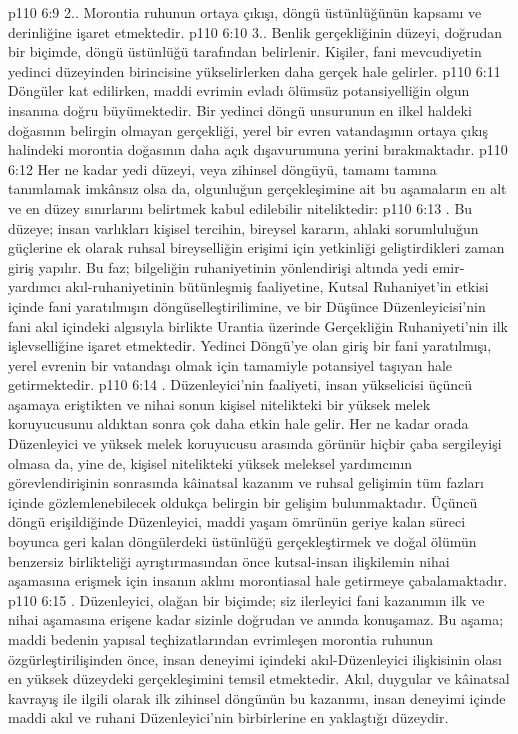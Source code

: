 \vs p110 6:9 2.\bibnobreakspace {}. Morontia ruhunun ortaya çıkışı, döngü üstünlüğünün kapsamı ve derinliğine işaret etmektedir.
\vs p110 6:10 3.\bibnobreakspace {}. Benlik gerçekliğinin düzeyi, doğrudan bir biçimde, döngü üstünlüğü tarafından belirlenir. Kişiler, fani mevcudiyetin yedinci düzeyinden birincisine yükselirlerken daha gerçek hale gelirler.
\vs p110 6:11 Döngüler kat edilirken, maddi evrimin evladı ölümsüz potansiyelliğin olgun insanına doğru büyümektedir. Bir yedinci döngü unsurunun en ilkel haldeki doğasının belirgin olmayan gerçekliği, yerel bir evren vatandaşının ortaya çıkış halindeki morontia doğasının daha açık dışavurumuna yerini bırakmaktadır.
\vs p110 6:12 Her ne kadar yedi düzeyi, veya zihinsel döngüyü, tamamı tamına tanımlamak imkânsız olsa da, olgunluğun gerçekleşimine ait bu aşamaların en alt ve en düzey sınırlarını belirtmek kabul edilebilir niteliktedir:
\vs p110 6:13 . Bu düzeye; insan varlıkları kişisel tercihin, bireysel kararın, ahlaki sorumluluğun güçlerine ek olarak ruhsal bireyselliğin erişimi için yetkinliği geliştirdikleri zaman giriş yapılır. Bu faz; bilgeliğin ruhaniyetinin yönlendirişi altında yedi emir\hyp{}yardımcı akıl\hyp{}ruhaniyetinin bütünleşmiş faaliyetine, Kutsal Ruhaniyet’in etkisi içinde fani yaratılmışın döngüselleştirilimine, ve bir Düşünce Düzenleyicisi’nin fani akıl içindeki algısıyla birlikte Urantia üzerinde Gerçekliğin Ruhaniyeti’nin ilk işlevselliğine işaret etmektedir. Yedinci Döngü’ye olan giriş bir fani yaratılmışı, yerel evrenin bir vatandaşı olmak için tamamiyle potansiyel taşıyan hale getirmektedir.
\vs p110 6:14 . Düzenleyici’nin faaliyeti, insan yükselicisi üçüncü aşamaya eriştikten ve nihai sonun kişisel nitelikteki bir yüksek melek koruyucusunu aldıktan sonra çok daha etkin hale gelir. Her ne kadar orada Düzenleyici ve yüksek melek koruyucusu arasında görünür hiçbir çaba sergileyişi olmasa da, yine de, kişisel nitelikteki yüksek meleksel yardımcının görevlendirişinin sonrasında kâinatsal kazanım ve ruhsal gelişimin tüm fazları içinde gözlemlenebilecek oldukça belirgin bir gelişim bulunmaktadır. Üçüncü döngü erişildiğinde Düzenleyici, maddi yaşam ömrünün geriye kalan süreci boyunca geri kalan döngülerdeki üstünlüğü gerçekleştirmek ve doğal ölümün benzersiz birlikteliği ayrıştırmasından önce kutsal\hyp{}insan ilişkilemin nihai aşamasına erişmek için insanın aklını morontiasal hale getirmeye çabalamaktadır.
\vs p110 6:15 . Düzenleyici, olağan bir biçimde; siz ilerleyici fani kazanımın ilk ve nihai aşamasına erişene kadar sizinle doğrudan ve anında konuşamaz. Bu aşama; maddi bedenin yapısal teçhizatlarından evrimleşen morontia ruhunun özgürleştirilişinden önce, insan deneyimi içindeki akıl\hyp{}Düzenleyici ilişkisinin olası en yüksek düzeydeki gerçekleşimini temsil etmektedir. Akıl, duygular ve kâinatsal kavrayış ile ilgili olarak ilk zihinsel döngünün bu kazanımı, insan deneyimi içinde maddi akıl ve ruhani Düzenleyici’nin birbirlerine en yaklaştığı düzeydir.
